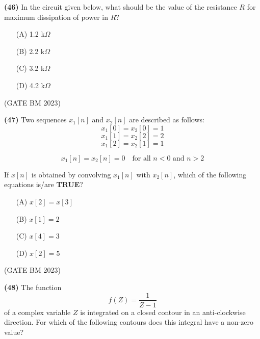 \documentclass[journal]{IEEEtran}
\numberwithin{equation}{enumi}
\numberwithin{figure}{enumi}
\begin{document}
\textbf{(46)} 
In the circuit given below, what should be the value of the resistance $R$ for maximum dissipation of power in $R$?

\begin{figure}[H]
\centering
{}%

\label{fig:my_label}
\end{figure}

\bigskip

\begin{itemize}
    \item[(A)] 1.2 k$\Omega$
    \item[(B)] 2.2 k$\Omega$
    \item[(C)] 3.2 k$\Omega$
    \item[(D)] 4.2 k$\Omega$
\end{itemize}
\hfill (GATE BM 2023)

\textbf{(47)}
Two sequences \( x_1[n] \) and \( x_2[n] \) are described as follows:
\[
x_1[0] = x_2[0] = 1
\]
\[
x_1[1] = x_2[2] = 2
\]
\[
x_1[2] = x_2[1] = 1
\]

\[
x_1[n] = x_2[n] = 0 \quad \text{for all } n < 0 \text{ and } n > 2
\]

If \( x[n] \) is obtained by convolving \( x_1[n] \) with \( x_2[n] \), which of the following equations is/are \textbf{TRUE}?

\bigskip

\begin{itemize}
    \item[(A)] \( x[2] = x[3] \)
    \item[(B)] \( x[1] = 2 \)
    \item[(C)] \( x[4] = 3 \)
    \item[(D)] \( x[2] = 5 \)
\end{itemize}
\hfill (GATE BM 2023)

\textbf{(48)}
The function 
\[
f(Z) = \frac{1}{Z - 1}
\]
of a complex variable \( Z \) is integrated on a closed contour in an anti-clockwise direction. For which of the following contours does this integral have a non-zero value?
\end{document}
